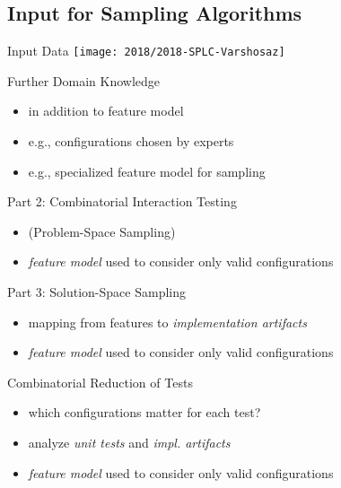 \subsection{Input for Sampling Algorithms}
\begin{frame}{\myframetitle{}}
	\begin{mycolumns}
		\begin{definition}{Input Data \mysource{\samplingsurvey}}
			\texttt{[image: 2018/2018-SPLC-Varshosaz]}
		\end{definition}
		\pause
		\begin{example}{Further Domain Knowledge \mysource{\samplingsurvey}}
			\begin{itemize}
				\item in addition to feature model
				\item e.g., configurations chosen by experts
				\item e.g., specialized feature model for sampling
			\end{itemize}
		\end{example}
	\mynextcolumn
		\pause
		\vspace{-5mm}
		\begin{example}{Part 2: Combinatorial Interaction Testing}
			\begin{itemize}
				\item (Problem-Space Sampling)
				\item \emph{feature model} used to consider only valid configurations
			\end{itemize}
		\end{example}
		\pause
		\begin{example}{Part 3: Solution-Space Sampling}
			\begin{itemize}
				\item mapping from features to \emph{implementation artifacts}
				\item \emph{feature model} used to consider only valid configurations
			\end{itemize}
		\end{example}
		\pause
		\begin{example}{Combinatorial Reduction of Tests \mysource{\reducingconfigurations}}
			\begin{itemize}
				\item which configurations matter for each test?
				\item analyze \emph{unit tests} and \emph{impl. artifacts}
				\item \emph{feature model} used to consider only valid configurations
			\end{itemize}
		\end{example}
	\end{mycolumns}
\end{frame}
